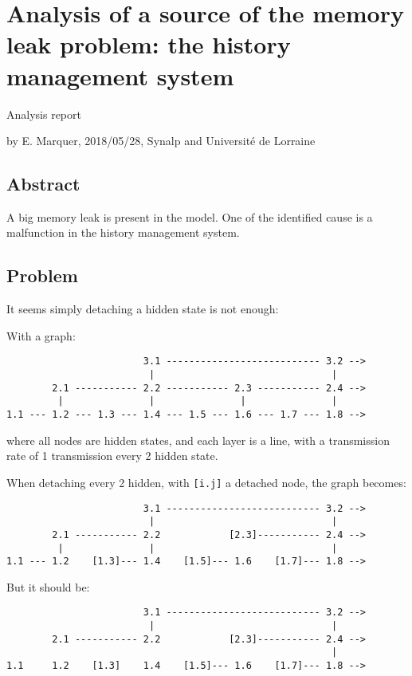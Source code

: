 \section*{Analysis of a source of the memory leak problem: the history
management
system}

Analysis report

by E. Marquer, 2018/05/28, Synalp and Université de Lorraine

\subsection{Abstract}

A big memory leak is present in the model. One of the identified cause
is a malfunction in the history management system.

\subsection{Problem}

It seems simply detaching a hidden state is not enough:

With a graph:
\begin{lstlisting}
                        3.1 --------------------------- 3.2 -->
                         |                               |
        2.1 ----------- 2.2 ----------- 2.3 ----------- 2.4 -->
         |               |               |               |
1.1 --- 1.2 --- 1.3 --- 1.4 --- 1.5 --- 1.6 --- 1.7 --- 1.8 -->
\end{lstlisting}
where all nodes are hidden states, and each layer is a line, with a
transmission rate of 1 transmission every 2 hidden state.

When detaching every 2 hidden, with \lstinline![i.j]! a detached node,
the graph becomes:

\begin{lstlisting}
                        3.1 --------------------------- 3.2 -->
                         |                               |
        2.1 ----------- 2.2            [2.3]----------- 2.4 -->
         |               |                               |
1.1 --- 1.2    [1.3]--- 1.4    [1.5]--- 1.6    [1.7]--- 1.8 -->
\end{lstlisting}

But it should be:

\begin{lstlisting}
                        3.1 --------------------------- 3.2 -->
                         |                               |
        2.1 ----------- 2.2            [2.3]----------- 2.4 -->
                                                         |
1.1     1.2    [1.3]    1.4    [1.5]--- 1.6    [1.7]--- 1.8 -->
\end{lstlisting}

